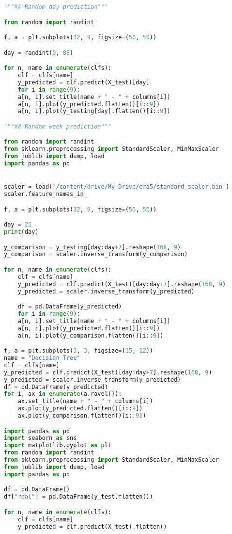 \begin{lstlisting}[label=python-listing,caption={Kod źródłowy},language=python]
"""## Random day prediction"""

from random import randint

f, a = plt.subplots(12, 9, figsize=(50, 50))

day = randint(0, 88)

for n, name in enumerate(clfs):
    clf = clfs[name]
    y_predicted = clf.predict(X_test)[day]
    for i in range(9):
    a[n, i].set_title(name + " - " + columns[i])
    a[n, i].plot(y_predicted.flatten()[i::9])
    a[n, i].plot(y_testing[day].flatten()[i::9])

"""## Random week prediction"""

from random import randint
from sklearn.preprocessing import StandardScaler, MinMaxScaler
from joblib import dump, load
import pandas as pd


scaler = load('/content/drive/My Drive/era5/standard_scaler.bin')
scaler.feature_names_in_

f, a = plt.subplots(12, 9, figsize=(50, 50))

day = 21
print(day)

y_comparison = y_testing[day:day+7].reshape(168, 9)
y_comparison = scaler.inverse_transform(y_comparison)

for n, name in enumerate(clfs):
    clf = clfs[name]
    y_predicted = clf.predict(X_test)[day:day+7].reshape(168, 9)
    y_predicted = scaler.inverse_transform(y_predicted)

    df = pd.DataFrame(y_predicted)
    for i in range(9):
    a[n, i].set_title(name + " - " + columns[i])
    a[n, i].plot(y_predicted.flatten()[i::9])
    a[n, i].plot(y_comparison.flatten()[i::9])

f, a = plt.subplots(3, 3, figsize=(15, 12))
name = "Decision Tree"
clf = clfs[name]
y_predicted = clf.predict(X_test)[day:day+7].reshape(168, 9)
y_predicted = scaler.inverse_transform(y_predicted)
df = pd.DataFrame(y_predicted)
for i, ax in enumerate(a.ravel()):
    ax.set_title(name + " - " + columns[i])
    ax.plot(y_predicted.flatten()[i::9])
    ax.plot(y_comparison.flatten()[i::9])

import pandas as pd
import seaborn as sns
import matplotlib.pyplot as plt
from random import randint
from sklearn.preprocessing import StandardScaler, MinMaxScaler
from joblib import dump, load
import pandas as pd

df = pd.DataFrame()
df["real"] = pd.DataFrame(y_test.flatten())

for n, name in enumerate(clfs):
    clf = clfs[name]
    y_predicted = clf.predict(X_test).flatten()


\end{lstlisting}
